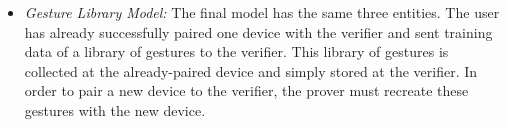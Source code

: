 \begin{itemize}

%
%

\item \emph{Gesture Library Model:} The final model has the same three entities. The user has already successfully paired one device with the verifier and sent training data of a library of gestures to the verifier. This library of gestures is collected at the already-paired device and simply stored at the verifier. In order to pair a new device to the verifier, the prover must recreate these gestures with the new device.


\end{itemize}
